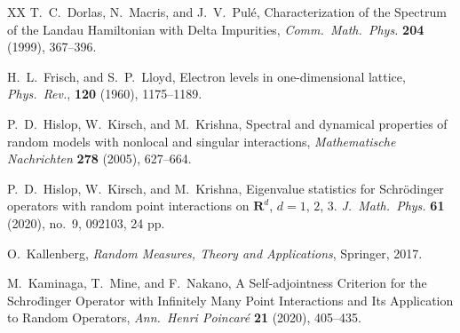 \documentclass[12pt,a4paper]{article}
\begin{document}
\begin{thebibliography}{XX}
T.\ C.\ Dorlas, N.\ Macris, and J.\ V.\ Pul\'e,
Characterization of the Spectrum of the Landau Hamiltonian
with Delta Impurities,
\textit{Comm.\ Math.\ Phys.} \textbf{204} (1999), 367--396.




H.\ L.\ Frisch, and S.\ P.\ Lloyd, Electron levels in one-dimensional lattice, 
\textit{Phys.\ Rev.}, \textbf{120} (1960), 1175--1189.




P.\ D.\ Hislop, W.\ Kirsch, and M.\ Krishna,
Spectral and dynamical properties of random models 
with nonlocal and singular interactions,
\textit{Mathematische Nachrichten} \textbf{278} (2005),
627--664.


P.\ D.\ Hislop, W.\ Kirsch, and M.\ Krishna,
Eigenvalue statistics for Schr\"odinger operators 
with random point interactions on $\mathbf{R}^d$, $d=1$, $2$, $3$. 
\textit{J.\ Math.\ Phys.} \textbf{61} (2020), no.\ 9, 092103, 24 pp. 


O.\ Kallenberg,
\textit{Random Measures, Theory and Applications},
Springer, 2017.


M.\ Kaminaga,  T.\ Mine, and F.\ Nakano,
A Self-adjointness Criterion for the Schro\"dinger Operator 
with Infinitely Many Point Interactions 
and Its Application to Random Operators,
\textit{Ann.\ Henri Poincar\'e} \textbf{21} (2020),
405--435.



\end{thebibliography}
\end{document}
